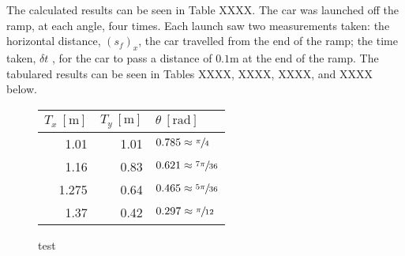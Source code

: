 \documentclass[a4paper]{article}
\begin{document}
The calculated results can be seen in Table XXXX. The car was launched off the ramp, at each angle, four times. Each launch saw two measurements taken: the horizontal distance, $(s_f)_x$, the car travelled from the end of the ramp; the time taken, $\delta t$ ,  for the car to pass a distance of $0.1\si{\meter}$ at the end of the ramp. The tabulared results can be seen in Tables XXXX, XXXX, XXXX, and XXXX below.

\begin{figure}[h]
	\begin{minipage}{0.45\textwidth}
		\centering
		\caption{test}
	\end{minipage}
	\hspace{1cm}
	\begin{minipage}{0.45\textwidth}
		\centering
		\begin{tabular}{rrl}
			\toprule
			$T_x \ [\si{\meter}]$ & $T_y \ [\si{\meter}]$ & $\theta \ [\si{\radian}]$\\
			\midrule
			1.01 & 1.01 & $0.785 \approx \sfrac{\pi}{4}$\\
			1.16 & 0.83 & $0.621 \approx \sfrac{7\pi}{36}$\\
			1.275 & 0.64 & $0.465 \approx \sfrac{5\pi}{36}$\\
			1.37 & 0.42 & $0.297 \approx \sfrac{\pi}{12}$\\
			\bottomrule
		\end{tabular}
	\end{minipage}
\end{figure}
\end{document}
